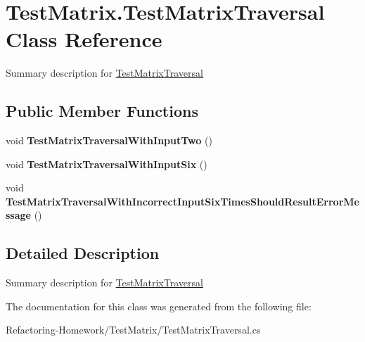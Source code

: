 \hypertarget{class_test_matrix_1_1_test_matrix_traversal}{\section{Test\+Matrix.\+Test\+Matrix\+Traversal Class Reference}
\label{class_test_matrix_1_1_test_matrix_traversal}
}


Summary description for \hyperlink{class_test_matrix_1_1_test_matrix_traversal}{Test\+Matrix\+Traversal}  


\subsection*{Public Member Functions}
\begin{DoxyCompactItemize}
\item 
\hypertarget{class_test_matrix_1_1_test_matrix_traversal_afbf1660077b0d581faec94a38c394e43}{void {\bfseries Test\+Matrix\+Traversal\+With\+Input\+Two} ()}\label{class_test_matrix_1_1_test_matrix_traversal_afbf1660077b0d581faec94a38c394e43}

\item 
\hypertarget{class_test_matrix_1_1_test_matrix_traversal_a7a35a2dcd6bb6770b09e70e62ecf3a5d}{void {\bfseries Test\+Matrix\+Traversal\+With\+Input\+Six} ()}\label{class_test_matrix_1_1_test_matrix_traversal_a7a35a2dcd6bb6770b09e70e62ecf3a5d}

\item 
\hypertarget{class_test_matrix_1_1_test_matrix_traversal_ae17659f5883953792589485410fd98a9}{void {\bfseries Test\+Matrix\+Traversal\+With\+Incorrect\+Input\+Six\+Times\+Should\+Result\+Error\+Message} ()}\label{class_test_matrix_1_1_test_matrix_traversal_ae17659f5883953792589485410fd98a9}

\end{DoxyCompactItemize}


\subsection{Detailed Description}
Summary description for \hyperlink{class_test_matrix_1_1_test_matrix_traversal}{Test\+Matrix\+Traversal} 



The documentation for this class was generated from the following file\+:\begin{DoxyCompactItemize}
\item 
Refactoring-\/\+Homework/\+Test\+Matrix/Test\+Matrix\+Traversal.\+cs\end{DoxyCompactItemize}
